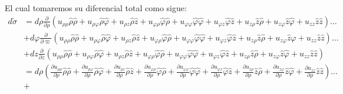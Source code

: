 \documentclass[11pt,letterpaper]{article}
\begin{document}
El cual tomaremos su diferencial total como sigue: 
\begin{align*}
    d\check{\sigma} & =d\rho \frac{\partial}{\partial \rho} (u_{\rho \rho}\hat{\rho} \hat{\rho} + u_{\rho \varphi} \hat{\rho} \hat{\varphi} + u_{\rho z}\hat{\rho }\hat{z} + u_{\varphi \rho}\hat{\varphi} \hat{\rho} + u_{\varphi \varphi} \hat{\varphi} \hat{\varphi} + u_{\varphi z}\hat{\varphi }\hat{z} + u_{z \rho} \hat{z}\hat{\rho} + u_{z \varphi}\hat{z}\hat{\varphi} + u_{z z} \hat{z}\hat{z})\dots \\ & + d\varphi \frac{\partial }{\partial \varpi} (u_{\rho \rho}\hat{\rho} \hat{\rho} + u_{\rho \varphi} \hat{\rho} \hat{\varphi} + u_{\rho z}\hat{\rho }\hat{z} + u_{\varphi \rho}\hat{\varphi} \hat{\rho} + u_{\varphi \varphi} \hat{\varphi} \hat{\varphi} + u_{\varphi z}\hat{\varphi }\hat{z} + u_{z \rho} \hat{z}\hat{\rho} + u_{z \varphi}\hat{z}\hat{\varphi} + u_{z z} \hat{z}\hat{z}) \dots \\ & + dz\frac{\partial}{\partial z}(u_{\rho \rho}\hat{\rho} \hat{\rho} + u_{\rho \varphi} \hat{\rho} \hat{\varphi} + u_{\rho z}\hat{\rho }\hat{z} + u_{\varphi \rho}\hat{\varphi} \hat{\rho} + u_{\varphi \varphi} \hat{\varphi} \hat{\varphi} + u_{\varphi z}\hat{\varphi }\hat{z} + u_{z \rho} \hat{z}\hat{\rho} + u_{z \varphi}\hat{z}\hat{\varphi} + u_{z z} \hat{z}\hat{z}) \\
    & = d\rho \left( \frac{\partial u_{\rho \rho }}{\partial \rho}  \hat{\rho} \hat{\rho} +  \frac{\partial u_{\rho \varphi }}{\partial \rho}\hat{\rho} \hat{\varphi}+\frac{\partial u_{\rho z }}{\partial \rho}\hat{\rho} \hat{z} + \frac{\partial u_{\varphi \rho }}{\partial \rho}\hat{\varphi} \hat{\rho}  + \frac{\partial u_{\varphi \varphi }}{\partial \rho}\hat{\varphi} \hat{\varphi}  + \frac{\partial u_{\varphi z }}{\partial \rho}\hat{\varphi} \hat{z}  + \frac{\partial u_{z \rho }}{\partial \rho}\hat{z} \hat{\rho} + \frac{\partial u_{z \varphi }}{\partial \rho}\hat{z} \hat{\varphi} + \frac{\partial u_{zz }}{\partial \rho}\hat{z} \hat{z}   \right)\dots \\
    & +  
\end{align*}
\end{document}
